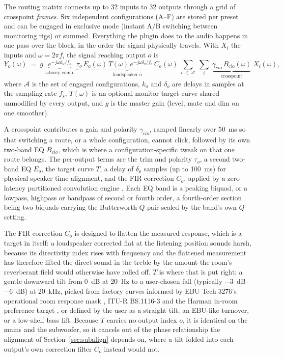 \documentclass[10pt,a4paper]{article}
\begin{document}
The routing matrix connects up to 32 inputs to 32 outputs through a grid of crosspoint \emph{frames}. Six independent configurations (A--F) are stored per preset and can be engaged in exclusive mode (instant A/B switching between monitoring rigs) or summed. Everything the plugin does to the audio happens in one pass over the block, in the order the signal physically travels. With $X_i$ the inputs and $\omega = 2\pi f$, the signal reaching output $o$ is
\begin{equation}
  Y_o(\omega) \;=\; g\;
    \underbrace{e^{-j\omega k_o/f_s}}_{\text{latency comp.}}\;
    \underbrace{\tau_o\,E_o(\omega)\,T(\omega)\,e^{-j\omega \delta_o/f_s}\,C_o(\omega)}_{\text{loudspeaker }o}\;
    \sum_{c\,\in\,\mathcal{A}}\;\sum_{i}\;
    \underbrace{\gamma_{cio}\,B_{cio}(\omega)}_{\text{crosspoint}}\;X_i(\omega),
  \label{eq:chain}
\end{equation}
where $\mathcal{A}$ is the set of engaged configurations, $k_o$ and $\delta_o$ are delays in samples at the sampling rate $f_s$, $T(\omega)$ is an optional monitor target curve shared unmodified by every output, and $g$ is the master gain (level, mute and dim on one smoother).

A crosspoint contributes a gain and polarity $\gamma_{cio}$, ramped linearly over \SI{50}{\milli\second} so that switching a route, or a whole configuration, cannot click, followed by its own two-band EQ $B_{cio}$, which is where a configuration-specific tweak on that one route belongs. The per-output terms are the trim and polarity $\tau_o$, a second two-band EQ $E_o$, the target curve $T$, a delay of $\delta_o$ samples (up to \SI{100}{\milli\second}) for physical speaker time-alignment, and the FIR correction $C_o$, applied by a zero-latency partitioned convolution engine \cite{Gardner1995}. Each EQ band is a peaking biquad, or a lowpass, highpass or bandpass of second or fourth order, a fourth-order section being two biquads carrying the Butterworth $Q$ pair scaled by the band's own $Q$ setting.

The FIR correction $C_o$ is designed to flatten the measured response, which is a target in itself: a loudspeaker corrected flat at the listening position sounds harsh, because its directivity index rises with frequency \cite{ITU1116} and the flattened measurement has therefore lifted the direct sound in the treble by the amount the room's reverberant field would otherwise have rolled off. $T$ is where that is put right: a gentle downward tilt from \SI{0}{\dB} at \SI{20}{\hertz} to a user-chosen fall (typically \SIrange{-3}{-6}{\dB}) at \SI{20}{\kilo\hertz}, picked from factory curves informed by EBU Tech 3276's operational room response mask \cite{EBU3276}, ITU-R BS.1116-3 \cite{ITU1116} and the Harman in-room preference target \cite{Olive2013,Toole2015}, or defined by the user as a straight tilt, an EBU-like turnover, or a low-shelf bass lift. Because $T$ carries no output index $o$, it is identical on the mains and the subwoofer, so it cancels out of the phase relationship the alignment of Section~\ref{sec:subalign} depends on, where a tilt folded into each output's own correction filter $C_o$ instead would not.
\end{document}
